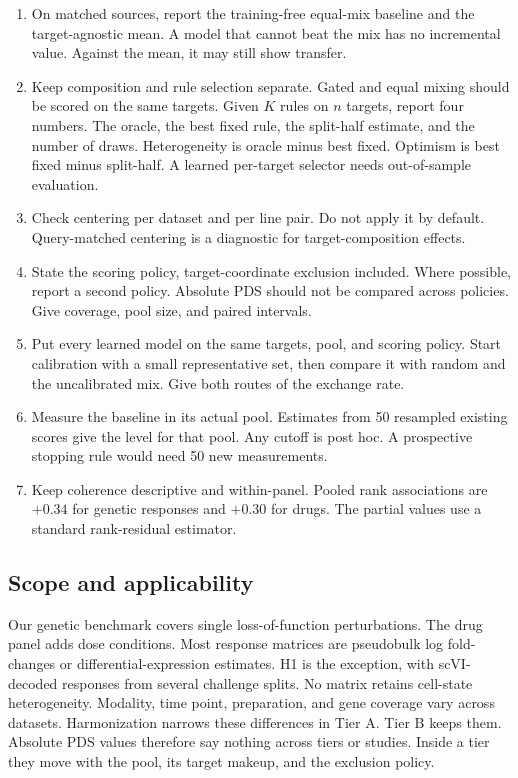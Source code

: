 \documentclass[12pt]{article}
\begin{document}
\begin{enumerate}
\item On matched sources, report the training-free equal-mix baseline and the target-agnostic mean. A model that cannot beat the mix has no incremental value. Against the mean, it may still show transfer.
\item Keep composition and rule selection separate. Gated and equal mixing should be scored on the same targets. Given $K$ rules on $n$ targets, report four numbers. The oracle, the best fixed rule, the split-half estimate, and the number of draws. Heterogeneity is oracle minus best fixed. Optimism is best fixed minus split-half. A learned per-target selector needs out-of-sample evaluation.
\item Check centering per dataset and per line pair. Do not apply it by default. Query-matched centering is a diagnostic for target-composition effects.
\item State the scoring policy, target-coordinate exclusion included. Where possible, report a second policy. Absolute PDS should not be compared across policies. Give coverage, pool size, and paired intervals.
\item Put every learned model on the same targets, pool, and scoring policy. Start calibration with a small representative set, then compare it with random and the uncalibrated mix. Give both routes of the exchange rate.
\item Measure the baseline in its actual pool. Estimates from 50 resampled existing scores give the level for that pool. Any cutoff is post hoc. A prospective stopping rule would need 50 new measurements.
\item Keep coherence descriptive and within-panel. Pooled rank associations are $+0.34$ for genetic responses and $+0.30$ for drugs. The partial values use a standard rank-residual estimator.
\end{enumerate}

\subsection*{Scope and applicability}

Our genetic benchmark covers single loss-of-function perturbations. The drug panel adds dose conditions. Most response matrices are pseudobulk log fold-changes or differential-expression estimates. H1 is the exception, with scVI-decoded responses from several challenge splits. No matrix retains cell-state heterogeneity. Modality, time point, preparation, and gene coverage vary across datasets. Harmonization narrows these differences in Tier A. Tier B keeps them. Absolute PDS values therefore say nothing across tiers or studies. Inside a tier they move with the pool, its target makeup, and the exclusion policy.
\end{document}
